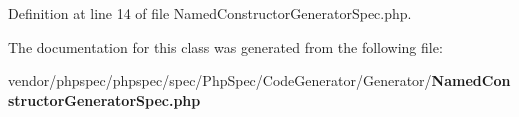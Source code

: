 Definition at line 14 of file Named\+Constructor\+Generator\+Spec.\+php.



The documentation for this class was generated from the following file\+:\begin{DoxyCompactItemize}
\item 
vendor/phpspec/phpspec/spec/\+Php\+Spec/\+Code\+Generator/\+Generator/{\bf Named\+Constructor\+Generator\+Spec.\+php}\end{DoxyCompactItemize}
